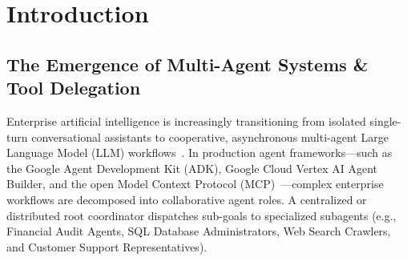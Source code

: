 \documentclass[conference,10pt]{IEEEtran}
\begin{document}
\section{Introduction}
\label{sec:intro}

\subsection{The Emergence of Multi-Agent Systems \& Tool Delegation}
Enterprise artificial intelligence is increasingly transitioning from isolated single-turn conversational assistants to cooperative, asynchronous multi-agent Large Language Model (LLM) workflows~\cite{schick2023toolformer}. In production agent frameworks---such as the Google Agent Development Kit (ADK), Google Cloud Vertex AI Agent Builder, and the open Model Context Protocol (MCP)~\cite{mcp2024}---complex enterprise workflows are decomposed into collaborative agent roles. A centralized or distributed root coordinator dispatches sub-goals to specialized subagents (e.g., Financial Audit Agents, SQL Database Administrators, Web Search Crawlers, and Customer Support Representatives).
\end{document}
